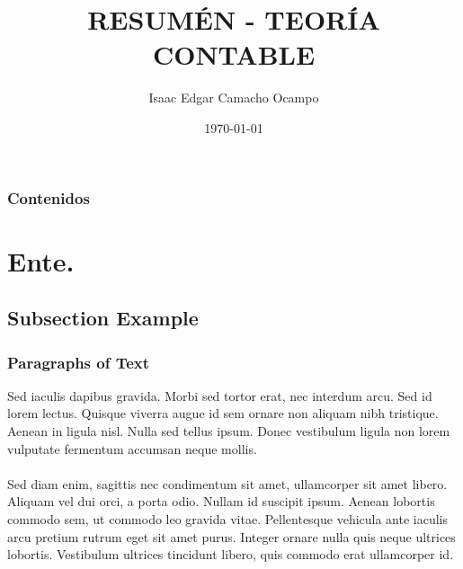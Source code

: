 \documentclass{beamer}
\title[Título]{RESUMÉN - TEORÍA CONTABLE} %
\author{Isaac Edgar Camacho Ocampo} %
\institute[UGR] %
{
  UNIVERSIDAD DE BUENOS AIRES \\ %
  DEPARTAMENTO DE CONTABILIDAD \\ %
  \medskip
  \textit{IsaacEdgarCamachoOCampo@gamil.com} %
}
\date{\today} %
\begin{document}
\begin{frame}
\titlepage %
\end{frame}

\begin{frame}
  \frametitle{Contenidos} %
  \tableofcontents
\end{frame}




\section{Ente.} %

\subsection{Subsection Example} %

\begin{frame}
\frametitle{Paragraphs of Text}
Sed iaculis dapibus gravida. Morbi sed tortor erat, nec interdum arcu. Sed id lorem lectus. Quisque viverra augue id sem ornare non aliquam nibh tristique. Aenean in ligula nisl. Nulla sed tellus ipsum. Donec vestibulum ligula non lorem vulputate fermentum accumsan neque mollis.\\~\\

Sed diam enim, sagittis nec condimentum sit amet, ullamcorper sit amet libero. Aliquam vel dui orci, a porta odio. Nullam id suscipit ipsum. Aenean lobortis commodo sem, ut commodo leo gravida vitae. Pellentesque vehicula ante iaculis arcu pretium rutrum eget sit amet purus. Integer ornare nulla quis neque ultrices lobortis. Vestibulum ultrices tincidunt libero, quis commodo erat ullamcorper id.
\end{frame}
\end{document}
